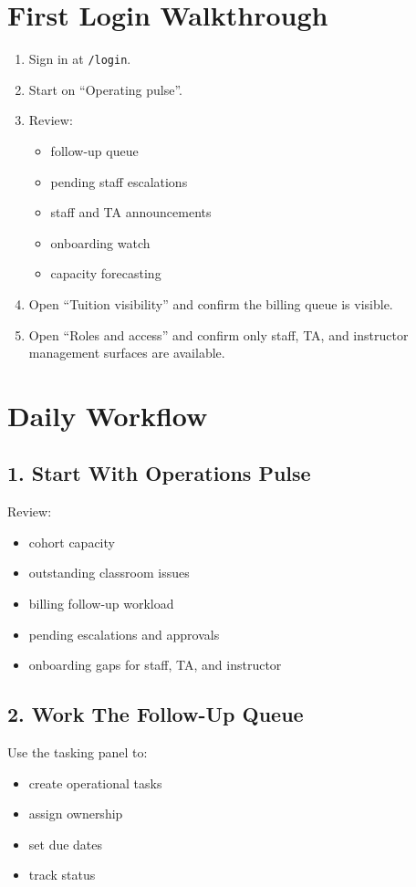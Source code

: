 \documentclass[11pt]{article}
\begin{document}
\section*{First Login Walkthrough}
\begin{enumerate}
  \item Sign in at \texttt{/login}.
  \item Start on ``Operating pulse''.
  \item Review:
  \begin{itemize}
    \item follow-up queue
    \item pending staff escalations
    \item staff and TA announcements
    \item onboarding watch
    \item capacity forecasting
  \end{itemize}
  \item Open ``Tuition visibility'' and confirm the billing queue is visible.
  \item Open ``Roles and access'' and confirm only staff, TA, and instructor management surfaces are available.
\end{enumerate}

\section*{Daily Workflow}
\subsection*{1. Start With Operations Pulse}
Review:
\begin{itemize}
  \item cohort capacity
  \item outstanding classroom issues
  \item billing follow-up workload
  \item pending escalations and approvals
  \item onboarding gaps for staff, TA, and instructor
\end{itemize}

\subsection*{2. Work The Follow-Up Queue}
Use the tasking panel to:
\begin{itemize}
  \item create operational tasks
  \item assign ownership
  \item set due dates
  \item track status
\end{itemize}
\end{document}
